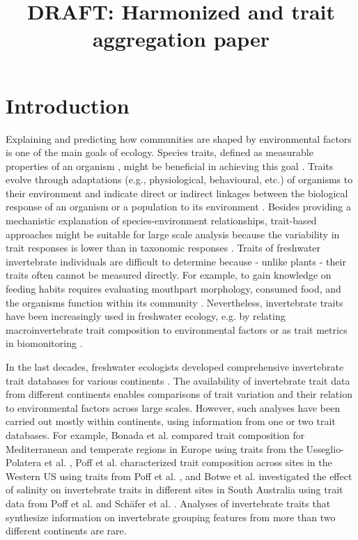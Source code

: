 \documentclass{article}
\title{DRAFT: Harmonized and trait aggregation paper }
\author{}%
\date{}
\begin{document}
\maketitle

\section*{Introduction}

Explaining and predicting how communities are shaped by environmental factors is one of the main goals of ecology. Species traits, defined as measurable properties of an organism \cite{mcgill_rebuilding_2006}, might be beneficial in achieving this goal \cite{heino_jani_macroecological_2013}. Traits evolve through adaptations (e.g., physiological, behavioural, etc.) of organisms to their environment and indicate direct or indirect linkages between the biological response of an organism or a population to its environment \cite{southwood_habitat_1977, verberk_delivering_2013}.
Besides providing a mechanistic explanation of species-environment relationships, trait-based approaches might be suitable for large scale analysis because the variability in trait responses is lower than in taxonomic responses \cite{bonada_taxonomic_2007, baird_toward_2011}. Traits of freshwater invertebrate individuals are difficult to determine because - unlike plants - their traits often cannot be measured directly. For example, to gain knowledge on feeding habits requires evaluating mouthpart morphology, consumed food, and the organisms function within its community \cite{moog_comprehensive_nodate}. Nevertheless, invertebrate traits have been increasingly used in freshwater ecology, e.g. by relating macroinvertebrate trait composition to environmental factors or as trait metrics in biomonitoring \cite{poff_developing_2010, szocs_effects_2014, bhowmik_large_2015, menezes_beyond_2010}.

In the last decades, freshwater ecologists developed comprehensive invertebrate trait databases for various continents \cite{usseglio-polatera_biomonitoring_2000, schmidt-kloiber_www.freshwaterecology.info_2015, vieira_database_nodate, Philips_and_Smith_NZ_DB_2018, kefford_integrated_2020, tomanova_trophic_2006}. The availability of invertebrate trait data from different continents enables comparisons of trait variation and their relation to environmental factors across large scales. However, such analyses have been carried out mostly within continents, using information from one or two trait databases. For example, Bonada et al. \cite{bonada_taxonomic_2007} compared trait composition for Mediterranean and temperate regions in Europe using traits from the Usseglio-Polatera et al. \cite{usseglio-polatera_biomonitoring_2000}, Poff et al. \cite{poff_developing_2010} characterized trait composition across sites in the Western US using traits from Poff et al. \cite{poff_functional_2006}, and Botwe et al. \cite{botwe_effects_2018} investigated the effect of salinity on invertebrate traits in different sites in South Australia using trait data from Poff et al. \cite{poff_functional_2006} and Schäfer et al. \cite{schafer_trait_2011}. Analyses of invertebrate traits that synthesize information on invertebrate grouping features from more than two different continents are rare. 
\end{document}

